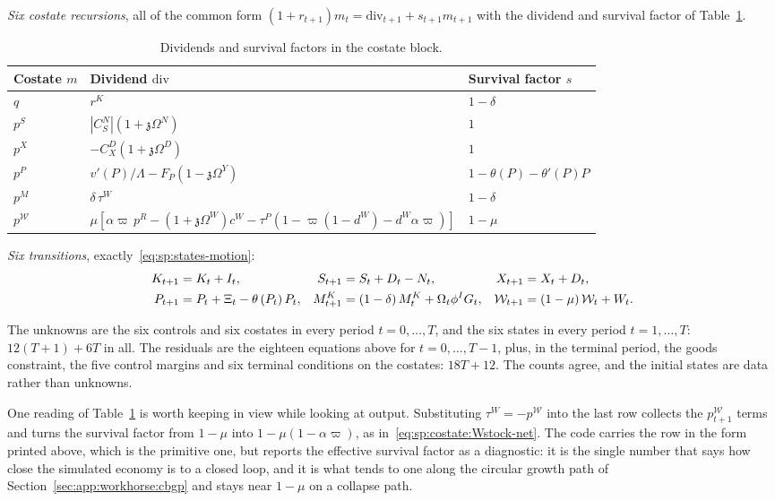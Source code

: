 \emph{Six costate recursions}, all of the common form $\left(1+r_{t+1}\right)m_t=\mathrm{div}_{t+1}+s_{t+1}m_{t+1}$ with the dividend and survival factor of Table~\ref{tab:q:costates}.

\begin{table}[H]
\centering
\caption{Dividends and survival factors in the costate block.}\label{tab:q:costates}
\begin{tabular}{lll}
\toprule
Costate $m$ & Dividend $\mathrm{div}$ & Survival factor $s$ \\
\midrule
$q$ & $r^K$ & $1-\delta$ \\
$p^S$ & $\left|C^N_S\right|\left(1+\mathfrak z\Omega^N\right)$ & $1$ \\
$p^X$ & $-C^D_X\left(1+\mathfrak z\Omega^D\right)$ & $1$ \\
$p^P$ & $v'\left(P\right)/\Lambda-F_P\left(1-\mathfrak z\Omega^Y\right)$ & $1-\theta\left(P\right)-\theta'\left(P\right)P$ \\
$p^M$ & $\delta\,\tau^W$ & $1-\delta$ \\
$p^{\mathcal W}$ & $\mu\left[\alpha\varpi\,p^R-\left(1+\mathfrak z\Omega^W\right)c^W-\tau^P\left(1-\varpi\left(1-d^W\right)-d^W\alpha\varpi\right)\right]$ & $1-\mu$ \\
\bottomrule
\end{tabular}
\end{table}

\emph{Six transitions}, exactly~\eqref{eq:sp:states-motion}:
\begin{align}
K_{t+1} &= K_t+I_t,
&
S_{t+1} &= S_t+D_t-N_t,
&
X_{t+1} &= X_t+D_t,
\notag\\
P_{t+1} &= P_t+\Xi_t-\theta\left(P_t\right)P_t,
&
M^K_{t+1} &= \left(1-\delta\right)M^K_t+\Omega_t\phi^IG_t,
&
\mathcal W_{t+1} &= \left(1-\mu\right)\mathcal W_t+W_t .
\label{eq:q:transitions}
\end{align}

 The unknowns are the six controls and six costates in every period $t=0,\dots,T$, and the six states in every period $t=1,\dots,T$: $12\left(T+1\right)+6T$ in all. The residuals are the eighteen equations above for $t=0,\dots,T-1$, plus, in the terminal period, the goods constraint, the five control margins and six terminal conditions on the costates: $18T+12$. The counts agree, and the initial states are data rather than unknowns.

 One reading of Table~\ref{tab:q:costates} is worth keeping in view while looking at output. Substituting $\tau^W=-p^{\mathcal W}$ into the last row collects the $p^{\mathcal W}_{t+1}$ terms and turns the survival factor from $1-\mu$ into $1-\mu\left(1-\alpha\varpi\right)$, as in~\eqref{eq:sp:costate:Wstock-net}. The code carries the row in the form printed above, which is the primitive one, but reports the effective survival factor as a diagnostic: it is the single number that says how close the simulated economy is to a closed loop, and it is what tends to one along the circular growth path of Section~\ref{sec:app:workhorse:cbgp} and stays near $1-\mu$ on a collapse path.
